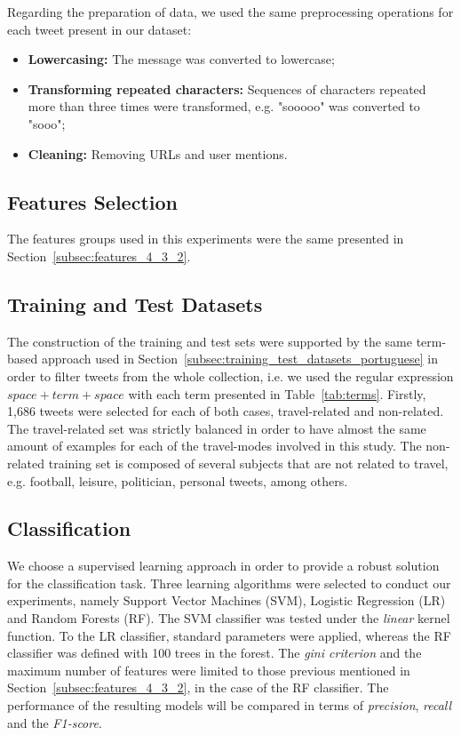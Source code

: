 Regarding the preparation of data, we used the same preprocessing operations for each tweet present in our dataset:

\begin{itemize}
	\item \textbf{Lowercasing:} The message was converted to lowercase;
	\item \textbf{Transforming repeated characters:} Sequences of characters repeated more than three times were transformed, e.g. "sooooo" was converted to "sooo";
	\item \textbf{Cleaning:} Removing URLs and user mentions.
\end{itemize}

\subsection{Features Selection}
The features groups used in this experiments were the same presented in Section~\ref{subsec:features_4_3_2}.

\subsection{Training and Test Datasets}

The construction of the training and test sets were supported by the same term-based approach used in Section~\ref{subsec:training_test_datasets_portuguese} in order to filter tweets from the whole collection, i.e. we used the regular expression $space + term + space$ with each term presented in Table~\ref{tab:terms}. Firstly, 1,686 tweets were selected for each of both cases, travel-related and non-related. The travel-related set was strictly balanced in order to have almost the same amount of examples for each of the travel-modes involved in this study. The non-related training set is composed of several subjects that are not related to travel, e.g. football, leisure, politician, personal tweets, among others.

\subsection{Classification}
We choose a supervised learning approach in order to provide a robust solution for the classification task. Three learning algorithms were selected to conduct our experiments, namely Support Vector Machines (SVM), Logistic Regression (LR) and Random Forests (RF). The SVM classifier was tested under the \textit{linear} kernel function. To the LR classifier, standard parameters were applied, whereas the RF classifier was defined with 100 trees in the forest. The \textit{gini criterion} and the maximum number of features were limited to those previous mentioned in Section~\ref{subsec:features_4_3_2}, in the case of the RF classifier.
The performance of the resulting models will be compared in terms of \emph{precision}, \emph{recall} and the \emph{F1-score}.

